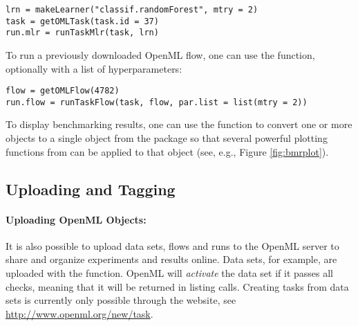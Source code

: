\begin{knitrout}\small
{}\color{fgcolor}\begin{kframe}
\begin{verbatim}
lrn = makeLearner("classif.randomForest", mtry = 2)
task = getOMLTask(task.id = 37)
run.mlr = runTaskMlr(task, lrn)
\end{verbatim}
\end{kframe}
\end{knitrout}


To run a previously downloaded OpenML flow, one can use the 
 function, optionally with a list of hyperparameters:
\begin{knitrout}\small
{}\color{fgcolor}\begin{kframe}
\begin{verbatim}
flow = getOMLFlow(4782)
run.flow = runTaskFlow(task, flow, par.list = list(mtry = 2))
\end{verbatim}
\end{kframe}
\end{knitrout}

To display benchmarking results, one can use the  function to convert
one or more  objects to a single  object from the
 package so that several powerful plotting functions 
from  can be applied to that object (see, e.g., Figure \ref{fig:bmrplot}).


\subsection{Uploading and Tagging}

\paragraph{Uploading OpenML Objects:}
It is also possible to upload data sets, flows and runs
to the OpenML server to share and organize experiments and results
online. Data sets, for example, are uploaded with the  function.
OpenML will \emph{activate} the data set if it passes all checks, meaning that it will be
returned in listing calls.
Creating tasks from data sets is currently only possible through
the website, see \url{http://www.openml.org/new/task}.


